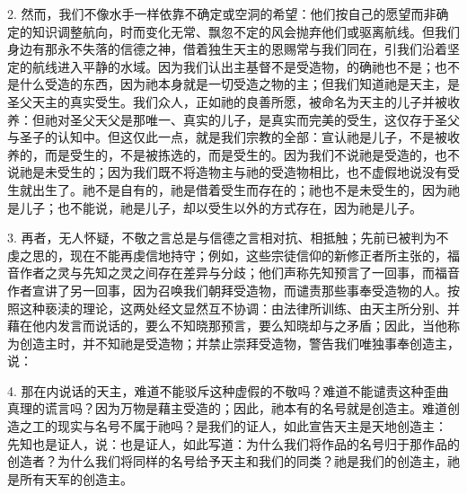 2. 然而，我们不像水手一样依靠不确定或空洞的希望：他们按自己的愿望而非确定的知识调整航向，时而变化无常、飘忽不定的风会抛弃他们或驱离航线。但我们身边有那永不失落的信德之神，借着独生天主的恩赐常与我们同在，引我们沿着坚定的航线进入平静的水域。因为我们认出主基督不是受造物，的确祂也不是；也不是什么受造的东西，因为祂本身就是一切受造之物的主；但我们知道祂是天主，是圣父天主的真实受生。我们众人，正如祂的良善所愿，被命名为天主的儿子并被收养：但祂对圣父天父是那唯一、真实的儿子，是真实而完美的受生，这仅存于圣父与圣子的认知中。但这仅此一点，就是我们宗教的全部：宣认祂是儿子，不是被收养的，而是受生的，不是被拣选的，而是受生的。因为我们不说祂是受造的，也不说祂是未受生的；因为我们既不将造物主与祂的受造物相比，也不虚假地说没有受生就出生了。祂不是自有的，祂是借着受生而存在的；祂也不是未受生的，因为祂是儿子；也不能说，祂是儿子，却以受生以外的方式存在，因为祂是儿子。\par

3. 再者，无人怀疑，不敬之言总是与信德之言相对抗、相抵触；先前已被判为不虔之思的，现在不能再虔信地持守；例如，这些宗徒信仰的新修正者所主张的，福音作者之灵与先知之灵之间存在差异与分歧；他们声称先知预言了一回事，而福音作者宣讲了另一回事，因为召唤我们朝拜受造物，而谴责那些事奉受造物的人。按照这种亵渎的理论，这两处经文显然互不协调：由法律所训练、由天主所分别、并藉在他内发言而说话的，要么不知晓那预言，要么知晓却与之矛盾；因此，当他称为创造主时，并不知祂是受造物；并禁止崇拜受造物，警告我们唯独事奉创造主，说：\par

4. 那在内说话的天主，难道不能驳斥这种虚假的不敬吗？难道不能谴责这种歪曲真理的谎言吗？因为万物是藉主受造的；因此，祂本有的名号就是创造主。难道创造之工的现实与名号不属于祂吗？是我们的证人，如此宣告天主是天地创造主： 先知也是证人，说：也是证人，如此写道：为什么我们将作品的名号归于那作品的创造者？为什么我们将同样的名号给予天主和我们的同类？祂是我们的创造主，祂是所有天军的创造主。\par

